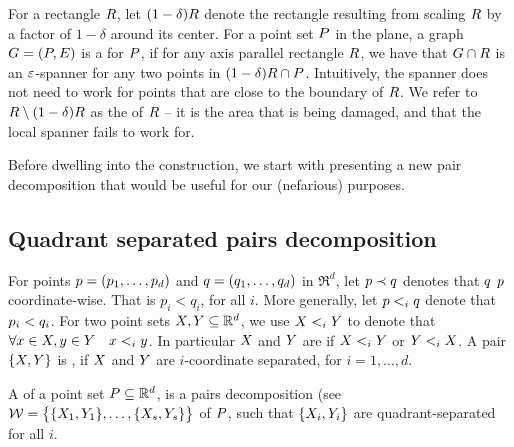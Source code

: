 \documentclass[12pt]{article}%
\begin{document}
For a rectangle $R$, let $(1-\delta)R$ denote the rectangle
resulting from scaling $R$ by a factor of $1-\delta$ around its
center. For a point set $P$ in the plane, a graph $G =(P,E)$ is
a  for $P$, if for any
axis parallel rectangle $R$, we have that $G \cap {R}$
is an $\varepsilon$-spanner for any two points in $(1-\delta)R \cap
P$. Intuitively, the spanner does not need to work for points that
are close to the boundary of $R$. We refer to
$R \setminus (1-\delta)R$ as the  of $R$ --
it is the area that is being damaged, and that the local spanner fails
to work for.

Before dwelling into the construction, we start with presenting a new
pair decomposition that would be useful for our (nefarious) purposes.



\subsection{Quadrant separated pairs decomposition}

For points $p = (p_1, \ldots, p_d)$ and $q = (q_1, \ldots, q_d)$
in $\Re^d$, let $p \prec q$ denotes that $q$ 
$p$ coordinate-wise. That is $p_i < q_i$, for all $i$. More
generally, let $p <_i q$ denote that $p_i < q_i$. For two
point sets $X, Y \subseteq \mathbb{R}^d$, we use $X <_i Y$ to
denote that $\forall x \in X, y \in Y \quad x <_i y$.
In particular $X$ and $Y$ are 
if $X <_i Y$ or $Y <_i X$. A pair $\{ X, Y\}$ is
, if $X$ and $Y$ are $i$-coordinate
separated, for $i=1,\ldots, d$.

A  of a point set
$P \subseteq \mathbb{R}^d$, is a pairs decomposition (see
$\mathcal{W} = \bigl\{ \{ X_1, Y_1 \}, \ldots, \{ X_s, Y_s \}
\bigr\}$ of $P$, such that $\{ X_i, Y_i\}$ are
quadrant-separated for all $i$.

\newcommand{\QS}{\Mh{\mathcal{Q}}}%
\newcommand{\liftX}[1]{\mathrm{lift}\pth{#1}}%
\end{document}

